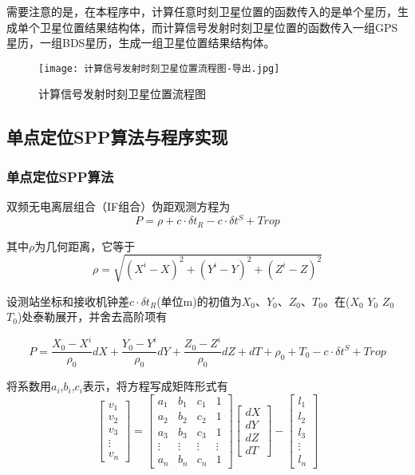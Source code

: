 \documentclass{ctexart}
\begin{document}
需要注意的是，在本程序中，计算任意时刻卫星位置的函数传入的是单个星历，生成单个卫星位置结果结构体，而计算信号发射时刻卫星位置的函数传入一组GPS星历，一组BDS星历，生成一组卫星位置结果结构体。
\begin{figure}[H]
\texttt{[image: 计算信号发射时刻卫星位置流程图-导出.jpg]}
\caption{计算信号发射时刻卫星位置流程图}
\end{figure}

\subsection{单点定位SPP算法与程序实现}
\subsubsection{单点定位SPP算法}
双频无电离层组合（IF组合）伪距观测方程为
\begin{equation}
P=\rho+c\cdot\delta t_R-c\cdot \delta t^S +Trop
\end{equation}

其中$\rho$为几何距离，它等于
\begin{equation}
\rho=\sqrt{(X^i-X)^2+(Y^i-Y)^2+(Z^i-Z)^2}
\label{eq:28}
\end{equation}

设测站坐标和接收机钟差$c\cdot\delta t_R$(单位m)的初值为$X_0$、$Y_0$、$Z_0$、$T_0$。在($X_0$ $Y_0$ $Z_0$ $T_0$)处泰勒展开，并舍去高阶项有

\begin{equation}
P=\frac{X_0-X^i}{\rho_0}dX+\frac{Y_0-Y^i}{\rho_0}dY+\frac{Z_0-Z^i}{\rho_0}dZ+dT+\rho_0+T_0 - c\cdot\delta t^S+Trop
\label{eq:29}
\end{equation}

将系数用$a_i$,$b_i$,$c_i$表示，将方程写成矩阵形式有
\begin{equation}
\begin{bmatrix}
v_1\\
v_2\\
v_3\\
\vdots\\
v_n
\end{bmatrix}=\begin{bmatrix}
a_1&b_1&c_1&1\\
a_2&b_2&c_2&1\\
a_3&b_3&c_3&1\\
\vdots&\vdots&\vdots&\vdots\\
a_n&b_n&c_n&1
\end{bmatrix}\begin{bmatrix}
dX\\
dY\\
dZ\\
dT
\end{bmatrix}-\begin{bmatrix}
l_1\\
l_2\\
l_3\\
\vdots\\
l_n
\end{bmatrix}
\label{eq:30}
\end{equation}
\end{document}
